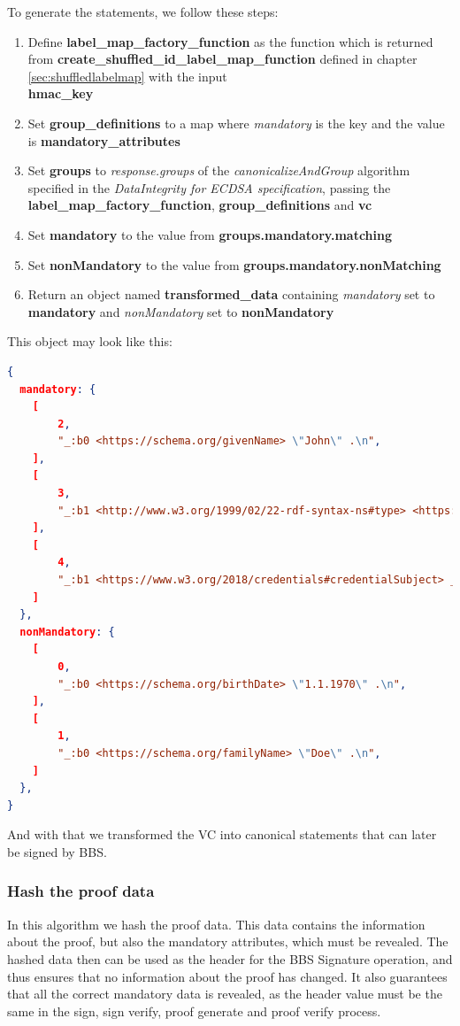 \documentclass[
	a4paper               %
	,BCOR=0mm            %
	,bibliography=totoc   %
	,listof=totoc         %
	,monolingual
	,twoside=false
]{bfhthesis}              %
\begin{document}
To generate the statements, we follow these steps:
\begin{enumerate}
	\item Define \textbf{label\_map\_factory\_function} as the function which is returned from \textbf{create\_shuffled\_id\_label\_map\_function} defined in chapter \ref{sec:shuffledlabelmap} with the input \\\textbf{hmac\_key}
	\item Set \textbf{group\_definitions} to a map where \textit{mandatory} is the key and the value is \textbf{mandatory\_attributes}
	\item Set \textbf{groups} to \textit{response.groups} of the \textit{canonicalizeAndGroup} algorithm specified in the \textit{DataIntegrity for ECDSA specification}\cite{ecdsa}, passing the \\\textbf{label\_map\_factory\_function}, \textbf{group\_definitions} and \textbf{vc}
	\item Set \textbf{mandatory} to the value from \textbf{groups.mandatory.matching}
	\item Set \textbf{nonMandatory} to the value from \textbf{groups.mandatory.nonMatching}
	\item Return an object named \textbf{transformed\_data} containing \textit{mandatory} set to \textbf{mandatory} and \textit{nonMandatory} set to \textbf{nonMandatory}
\end{enumerate}

\newpage
This object may look like this:
\begin{lstlisting}[language=json,firstnumber=1,caption={Return object of the VC transformation},captionpos=b]
{
  mandatory: {
	[
		2,
		"_:b0 <https://schema.org/givenName> \"John\" .\n",
	],
	[
		3,
		"_:b1 <http://www.w3.org/1999/02/22-rdf-syntax-ns#type> <https://www.w3.org/2018/credentials#VerifiableCredential> .\n",
  	],
  	[
		4,
		"_:b1 <https://www.w3.org/2018/credentials#credentialSubject> _:b0 .\n",
	]
  },
  nonMandatory: {
	[
		0,
		"_:b0 <https://schema.org/birthDate> \"1.1.1970\" .\n",
	],
	[
		1,
		"_:b0 <https://schema.org/familyName> \"Doe\" .\n",
	]
  },
}
\end{lstlisting}

And with that we transformed the VC into canonical statements that can later be signed by BBS.

\subsubsection{Hash the proof data}
\label{subsec:proofHash}
In this algorithm we hash the proof data. This data contains the information about the proof, but also the mandatory attributes, which must be revealed.
The hashed data then can be used as the header for the BBS Signature operation, and thus ensures that no information about the proof has changed. It also guarantees that all the correct mandatory data is revealed, as the header value must be the same in the sign, sign verify, proof generate and proof verify process.\\
\end{document}
